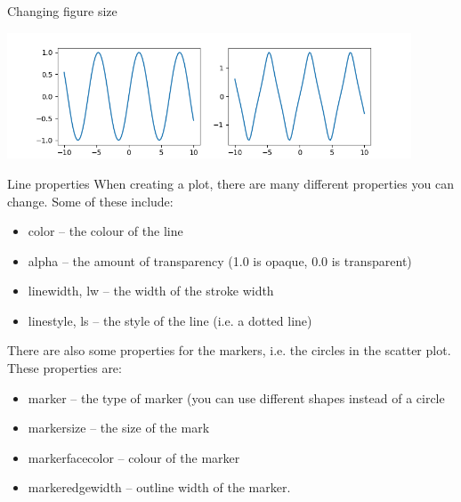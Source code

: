 \documentclass[10pt]{beamer}
\begin{document}
\begin{frame}[label={sec:org0a70a58}]{Changing figure size}
\begin{center}
\includegraphics[width=0.9\textwidth]{images/figsize-2.png}
\end{center}
\end{frame}

\begin{frame}[label={sec:org3ba048e}]{Line properties}
When creating a plot, there are many different properties you can change. Some
of these include:

\begin{itemize}
\item color -- the colour of the line
\item alpha -- the amount of transparency (1.0 is opaque, 0.0 is transparent)
\item linewidth, lw -- the width of the stroke width
\item linestyle, ls -- the style of the line (i.e. a dotted line)
\end{itemize}

There are also some properties for the markers, i.e. the circles in the scatter
plot. These properties are:

\begin{itemize}
\item marker -- the type of marker (you can use different shapes instead of a circle
\item markersize -- the size of the mark
\item markerfacecolor -- colour of the marker
\item markeredgewidth -- outline width of the marker.
\end{itemize}
\end{frame}
\end{document}
